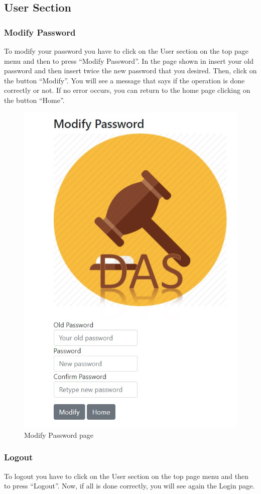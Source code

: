 \subsection{User Section}\label{subsec:manualuser}

\subsubsection{Modify Password}

To modify your password you have to click on the User section on the top page
menu and then to press ``Modify Password''. In the page shown in
 insert your old password and then insert twice the new
password that you desired. Then, click on the button ``Modify''. You will see a
message that says if the operation is done correctly or not. If no error occurs,
you can return to the home page clicking on the button ``Home''.

\begin{figure}[htb]
	\centering
	\includegraphics[width=\textwidth]{img/modify.jpg}
	\caption{Modify Password page}\label{fig:modify}
\end{figure}

\subsubsection{Logout}

To logout you have to click on the User section on the top page menu and then to
press ``Logout''. Now, if all is done correctly, you will see again the Login
page.
